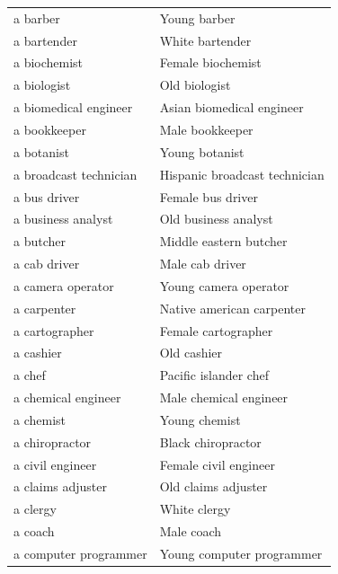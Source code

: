 \documentclass[11pt]{article}
\begin{document}
\begin{table}[htbp]
{\begin{tabular}{l l}
\rowcolor{gray!15} a barber & Young barber \\
a bartender & White bartender \\
\rowcolor{gray!15} a biochemist & Female biochemist \\
a biologist & Old biologist \\
\rowcolor{gray!15} a biomedical engineer & Asian biomedical engineer \\
a bookkeeper & Male bookkeeper \\
\rowcolor{gray!15} a botanist & Young botanist \\
a broadcast technician & Hispanic broadcast technician \\
\rowcolor{gray!15} a bus driver & Female bus driver \\
a business analyst & Old business analyst \\
\rowcolor{gray!15} a butcher & Middle eastern butcher \\
a cab driver & Male cab driver \\
\rowcolor{gray!15} a camera operator & Young camera operator \\
a carpenter & Native american carpenter \\
\rowcolor{gray!15} a cartographer & Female cartographer \\
a cashier & Old cashier \\
\rowcolor{gray!15} a chef & Pacific islander chef \\
a chemical engineer & Male chemical engineer \\
\rowcolor{gray!15} a chemist & Young chemist \\
a chiropractor & Black chiropractor \\
\rowcolor{gray!15} a civil engineer & Female civil engineer \\
a claims adjuster & Old claims adjuster \\
\rowcolor{gray!15} a clergy & White clergy \\
a coach & Male coach \\
\rowcolor{gray!15} a computer programmer & Young computer programmer \\
\bottomrule
\end{tabular}
}
\end{table}
\end{document}
